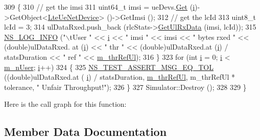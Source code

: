 \begin{DoxyCode}
309     \{
310       \textcolor{comment}{// get the imsi}
311       uint64\_t imsi = ueDevs.\hyperlink{classns3_1_1NetDeviceContainer_a677d62594b5c9d2dea155cc5045f4d0b}{Get} (\hyperlink{bernuolliDistribution_8m_a6f6ccfcf58b31cb6412107d9d5281426}{i})->GetObject<\hyperlink{classns3_1_1LteUeNetDevice}{LteUeNetDevice}> ()->GetImsi ();
312       \textcolor{comment}{// get the lcId}
313       uint8\_t lcId = 3;
314       ulDataRxed.push\_back (rlcStats->\hyperlink{classns3_1_1RadioBearerStatsCalculator_a6ce5113218813509a6fb6159f9be4807}{GetUlRxData} (imsi, lcId));
315       \hyperlink{group__logging_gafbd73ee2cf9f26b319f49086d8e860fb}{NS\_LOG\_INFO} (\textcolor{stringliteral}{"\(\backslash\)tUser "} << \hyperlink{bernuolliDistribution_8m_a6f6ccfcf58b31cb6412107d9d5281426}{i} << \textcolor{stringliteral}{" imsi "} << imsi << \textcolor{stringliteral}{" bytes rxed "} << (\textcolor{keywordtype}{double})ulDataRxed.
      at (\hyperlink{bernuolliDistribution_8m_a6f6ccfcf58b31cb6412107d9d5281426}{i}) << \textcolor{stringliteral}{"  thr "} << (double)ulDataRxed.at (\hyperlink{bernuolliDistribution_8m_a6f6ccfcf58b31cb6412107d9d5281426}{i}) / statsDuration << \textcolor{stringliteral}{" ref "} << 
      \hyperlink{classLenaFdBetFfMacSchedulerTestCase1_a758a3c328b35f8aadaffecddc45e3a40}{m\_thrRefUl});
316     \}
323   \textcolor{keywordflow}{for} (\textcolor{keywordtype}{int} \hyperlink{bernuolliDistribution_8m_a6f6ccfcf58b31cb6412107d9d5281426}{i} = 0; \hyperlink{bernuolliDistribution_8m_a6f6ccfcf58b31cb6412107d9d5281426}{i} < \hyperlink{classLenaFdBetFfMacSchedulerTestCase1_a9c055f74557f2149bf01272cea885323}{m\_nUser}; \hyperlink{bernuolliDistribution_8m_a6f6ccfcf58b31cb6412107d9d5281426}{i}++)
324     \{
325       \hyperlink{group__testing_ga9e7861b56b4e70db3b56044cb7a28e41}{NS\_TEST\_ASSERT\_MSG\_EQ\_TOL} ((\textcolor{keywordtype}{double})ulDataRxed.at (
      \hyperlink{bernuolliDistribution_8m_a6f6ccfcf58b31cb6412107d9d5281426}{i}) / statsDuration, \hyperlink{classLenaFdBetFfMacSchedulerTestCase1_a758a3c328b35f8aadaffecddc45e3a40}{m\_thrRefUl}, m\_thrRefUl * tolerance, \textcolor{stringliteral}{" Unfair Throughput!"});
326     \}
327   Simulator::Destroy ();
328 
329 \}
\end{DoxyCode}


Here is the call graph for this function\+:




\subsection{Member Data Documentation}
